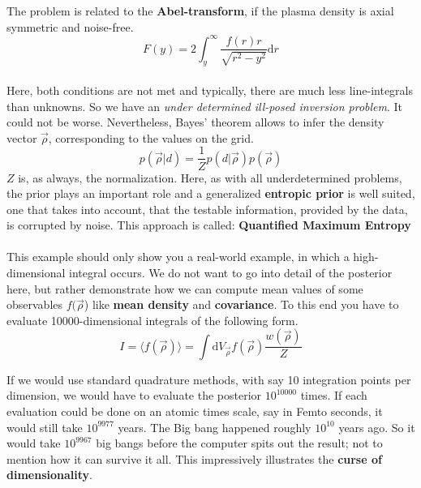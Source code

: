 \documentclass[12pt, a4paper]{scrartcl}
\begin{document}
The problem is related to the  \textbf{Abel-transform}, if the plasma density is axial
symmetric and noise-free. 
\begin{equation*}\boxed{F(y)=2\int_y^{\infty}\frac{f(r)r}{\sqrt{r^2-y^2}}\text{d}r
}\end{equation*}\\
Here, both conditions are not met and typically,
there are much less line-integrals than unknowns. So we have an \textit{under determined ill-posed inversion problem}. It could not be worse.
Nevertheless, Bayes’ theorem allows to infer the density vector $\vec{\rho}$, corresponding to the values on the grid.
\[p(\vec{\rho}|d)=\frac 1Z p(d|\vec{\rho})p(\vec{\rho})\]
$Z$ is, as always, the normalization. Here, as with all underdetermined problems, the prior plays an important role and a generalized \textbf{entropic prior} is well suited, one that takes into account, that the testable information, provided by the data, is corrupted by noise. This approach is called:  \textbf{Quantified Maximum Entropy}\\

\\

This example should only show you a real-world example, in which a high-dimensional integral occurs. We do not want to go into detail of the posterior
here, but rather demonstrate how we can compute mean values of some
observables $f(\vec{\rho}$) like  \textbf{mean density} and  \textbf{covariance}. To this end you have to
evaluate 10000-dimensional integrals of the following form.
\[I=\langle f(\vec{\rho})\rangle = \int \text{d}V_{\vec{\rho}}f(\vec{\rho})\frac{w(\vec{\rho})}{Z}\]

If we would use standard quadrature methods, with say 10 integration points
per dimension, we would have to evaluate the posterior $10^{10000}$
times. If each evaluation could be done on an atomic times scale, say in
Femto seconds, it would still take $10^{9977}$ years. The Big bang happened
roughly $10^{10}$ years ago. So it would take $10^{9967}$ big bangs before the computer spits out the result; not to mention how it can survive it all. This impressively
illustrates the  \textbf{curse of dimensionality}.\\
\end{document}
